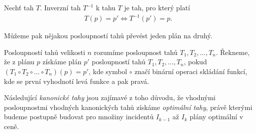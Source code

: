 \begin{definice}\label{df:tah}
  Nechť tah $T$. Inverzní tah $T^{-1}$ k tahu $T$ je tah, pro který platí
  \begin{align*}
    T(p) = p' \Leftrightarrow T^{-1}(p') = p.
  \end{align*}
\end{definice}

Můžeme pak nějakou posloupností tahů převést jeden plán na druhý.
\begin{definice}
  Posloupností tahů velikosti $n$ rozumíme posloupnost tahů $T_1, T_2, \dots, T_n$.
  Řekneme, že z plánu $p$ získáme plán $p'$ posloupností tahů $T_1, T_2, \dots, T_n$,
  pokud $(T_1 \circ T_2 \circ \dots \circ T_n)(p) = p'$, kde symbol $\circ$ značí binární operaci skládání funkcí,
  kde se první vyhodnotí levá funkce a pak pravá.
\end{definice}

Následující \textit{kanonické tahy} jsou zajímavé z toho důvodu, že vhodnými posloupnostmi vhodných kanonických tahů získáme \textit{optimální tahy},
právě kterými budeme postupně budovat pro množiny incidentů $I_{k-1}$ až $I_k$ plány optimální v ceně. 

